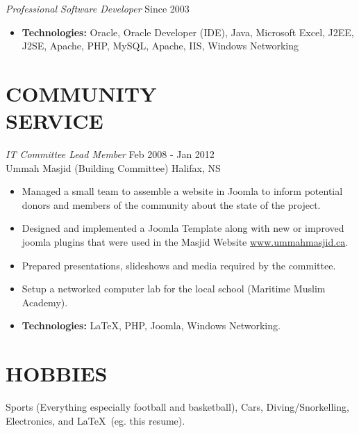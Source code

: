 \documentclass[line,margin]{res}
\begin{document}
\begin{resume}
    {\sl Professional Software Developer} \hfill Since 2003 \smallskip
        \begin{itemize}  \itemsep -2pt %
    \item {\bf Technologies:} \hspace{3pt}
        Oracle, Oracle Developer (IDE), Java, Microsoft Excel, \newline
        \hspace*{72pt} J2EE, J2SE, Apache, PHP, MySQL, Apache, IIS, \newline
        \hspace*{72pt} Windows Networking
        \end{itemize}

\section{COMMUNITY \\ SERVICE}
    {\sl IT Committee Lead Member} \hfill Feb 2008 - Jan 2012 \\
    Ummah Masjid (Building Committee) \hfill Halifax, NS \smallskip
        \begin{itemize}  \itemsep -2pt %
    \item Managed a small team to assemble a website in Joomla to inform
    potential donors and members of the community about the state of the
    project.
    \item Designed and implemented a Joomla Template along with new or
    improved joomla plugins that were used in the Masjid Website
    \href{http://www.ummahmasjid.ca}{www.ummahmasjid.ca}.
    \item Prepared presentations, slideshows and media
    required by the committee.
    \item Setup a networked computer lab for the local school (Maritime
    Muslim Academy).
    \item {\bf Technologies:} \hspace{1pt}
        \LaTeX, PHP, Joomla, Windows Networking.
        \end{itemize}

\section{HOBBIES}
    Sports (Everything especially football and basketball), Cars,
    Diving/Snorkelling, \\Electronics, and \LaTeX\ (eg. this resume).

\end{resume}
\end{document}
